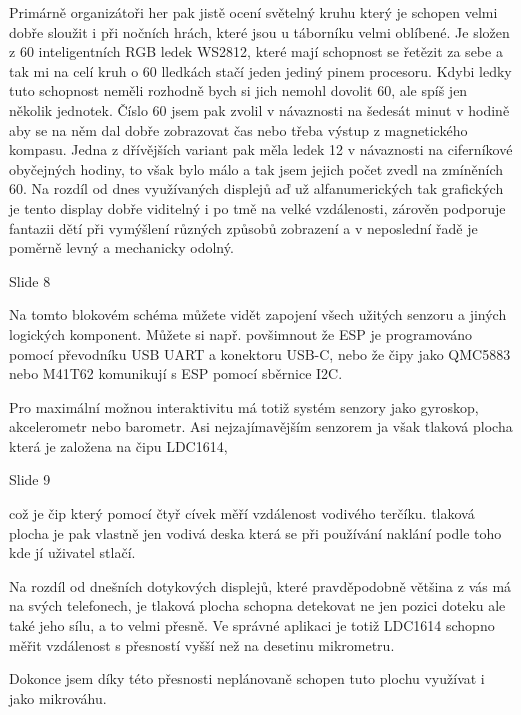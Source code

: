 Primárně organizátoři her pak jistě ocení světelný kruhu který je schopen velmi dobře sloužit i při nočních hrách,
které jsou u táborníku velmi oblíbené.
Je složen z 60 inteligentních RGB ledek WS2812, které mají schopnost se řetězit za sebe a tak mi na celí kruh o 60 lledkách
stačí jeden jediný pinem procesoru. Kdybi ledky tuto schopnost neměli rozhodně bych si jich nemohl dovolit 60,
ale spíš jen několik jednotek. Číslo 60 jsem pak zvolil v návaznosti na šedesát 
minut v hodině aby se na něm dal dobře zobrazovat čas nebo třeba výstup z magnetického kompasu. 
Jedna z dřívějších variant pak měla ledek 12 v návaznosti na ciferníkové obyčejných hodiny,
to však bylo málo a tak jsem jejich počet zvedl na zmíněních 60.
Na rozdíl od dnes využívaných displejů aď už alfanumerických tak grafických je tento display dobře viditelný i po tmě na velké vzdálenosti, 
zárověn podporuje fantazii dětí při vymýšlení různých způsobů zobrazení a v neposlední řadě je poměrně levný a mechanicky odolný. %


Slide 8

Na tomto blokovém schéma můžete vidět zapojení všech užitých senzoru a jiných logických komponent.
Můžete si např. povšimnout že ESP je programováno pomocí převodníku USB UART a konektoru USB-C,
nebo že čipy jako QMC5883 nebo M41T62 komunikují s ESP pomocí sběrnice I2C.

Pro maximální možnou interaktivitu má totiž systém senzory jako gyroskop, akcelerometr nebo barometr. 
Asi nejzajímavějším senzorem ja však tlaková plocha která je založena na čipu LDC1614, 


Slide 9

což je čip který 
pomocí čtyř cívek měří vzdálenost vodivého terčíku. tlaková plocha je pak vlastně 
jen vodivá deska která se při používání naklání podle toho kde jí uživatel stlačí. 

Na rozdíl od dnešních dotykových displejů,
které pravděpodobně většina z vás má na svých telefonech, je tlaková plocha schopna detekovat ne jen pozici doteku ale také jeho sílu,
a to velmi přesně. Ve správné aplikaci je totiž LDC1614 schopno měřit vzdálenost s přesností vyšší než na desetinu mikrometru.

Dokonce jsem díky této přesnosti neplánovaně schopen tuto plochu využívat i jako mikrováhu.


